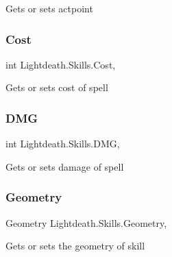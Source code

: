Gets or sets actpoint 

\hypertarget{class_lightdeath_1_1_skills_a319e914b227ebf49e511031092e08ec0}{}\label{class_lightdeath_1_1_skills_a319e914b227ebf49e511031092e08ec0} 
\subsubsection{\texorpdfstring{Cost}{Cost}}
{\footnotesize\ttfamily int Lightdeath.\+Skills.\+Cost\hspace{0.3cm}{\ttfamily [get]}, {\ttfamily [set]}}



Gets or sets cost of spell 

\hypertarget{class_lightdeath_1_1_skills_a5f0f4b3c89f1f6b65485407a7c61708d}{}\label{class_lightdeath_1_1_skills_a5f0f4b3c89f1f6b65485407a7c61708d} 
\subsubsection{\texorpdfstring{D\+MG}{DMG}}
{\footnotesize\ttfamily int Lightdeath.\+Skills.\+D\+MG\hspace{0.3cm}{\ttfamily [get]}, {\ttfamily [set]}}



Gets or sets damage of spell 

\hypertarget{class_lightdeath_1_1_skills_a1824757727a15132061b239af0f915e1}{}\label{class_lightdeath_1_1_skills_a1824757727a15132061b239af0f915e1} 
\subsubsection{\texorpdfstring{Geometry}{Geometry}}
{\footnotesize\ttfamily Geometry Lightdeath.\+Skills.\+Geometry\hspace{0.3cm}{\ttfamily [get]}, {\ttfamily [set]}}



Gets or sets the geometry of skill 

\hypertarget{class_lightdeath_1_1_skills_a2a0ab366d440671974308c0883e6efd4}{}\label{class_lightdeath_1_1_skills_a2a0ab366d440671974308c0883e6efd4} 
